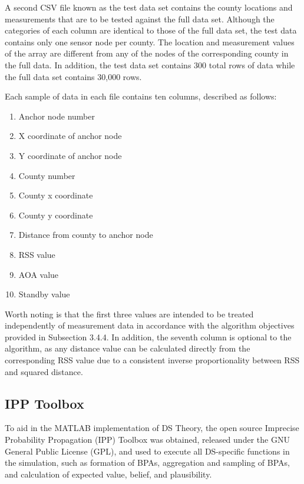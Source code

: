 \documentclass[12pt]{uthesis-v12}  %
\begin{document}
A second CSV file known as the test data set contains the county locations and measurements that are to be tested against the full data set. Although the categories of each column are identical to those of the full data set, the test data contains only one sensor node per county. The location and measurement values of the array are different from any of the nodes of the corresponding county in the full data. In addition, the test data set contains 300 total rows of data while the full data set contains 30,000 rows.

Each sample of data in each file contains ten columns, described as follows:

\begin{enumerate}
	\item Anchor node number
	\item X coordinate of anchor node
	\item Y coordinate of anchor node
	\item County number
	\item County x coordinate
	\item County y coordinate
	\item Distance from county to anchor node
	\item RSS value
	\item AOA value
	\item Standby value
\end{enumerate}

\noindent Worth noting is that the first three values are intended to be treated independently of measurement data in accordance with the algorithm objectives provided in Subsection 3.4.4. In addition, the seventh column is optional to the algorithm, as any distance value can be calculated directly from the corresponding RSS value due to a consistent inverse proportionality between RSS and squared distance.

\subsection{IPP Toolbox}

To aid in the MATLAB implementation of DS Theory, the open source Imprecise Probability Propagation (IPP) Toolbox \cite{ipp} was obtained, released under the GNU General Public License (GPL), and used to execute all DS-specific functions in the simulation, such as formation of BPAs, aggregation and sampling of BPAs, and calculation of expected value, belief, and plausibility.
\end{document}
